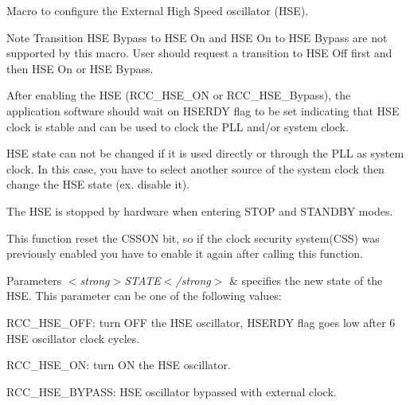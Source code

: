 Macro to configure the External High Speed oscillator (H\+SE). 

\begin{DoxyNote}{Note}
Transition H\+SE Bypass to H\+SE On and H\+SE On to H\+SE Bypass are not supported by this macro. User should request a transition to H\+SE Off first and then H\+SE On or H\+SE Bypass. 

After enabling the H\+SE (R\+C\+C\+\_\+\+H\+S\+E\+\_\+\+ON or R\+C\+C\+\_\+\+H\+S\+E\+\_\+\+Bypass), the application software should wait on H\+S\+E\+R\+DY flag to be set indicating that H\+SE clock is stable and can be used to clock the P\+LL and/or system clock. 

H\+SE state can not be changed if it is used directly or through the P\+LL as system clock. In this case, you have to select another source of the system clock then change the H\+SE state (ex. disable it). 

The H\+SE is stopped by hardware when entering S\+T\+OP and S\+T\+A\+N\+D\+BY modes. 

This function reset the C\+S\+S\+ON bit, so if the clock security system(\+C\+S\+S) was previously enabled you have to enable it again after calling this function. 
\end{DoxyNote}

\begin{DoxyParams}{Parameters}
{\em $<$strong$>$\+S\+T\+A\+T\+E$<$/strong$>$} & specifies the new state of the H\+SE. This parameter can be one of the following values\+: \begin{DoxyItemize}
\item R\+C\+C\+\_\+\+H\+S\+E\+\_\+\+O\+FF\+: turn O\+FF the H\+SE oscillator, H\+S\+E\+R\+DY flag goes low after 6 H\+SE oscillator clock cycles. \item R\+C\+C\+\_\+\+H\+S\+E\+\_\+\+ON\+: turn ON the H\+SE oscillator. \item R\+C\+C\+\_\+\+H\+S\+E\+\_\+\+B\+Y\+P\+A\+SS\+: H\+SE oscillator bypassed with external clock. \end{DoxyItemize}
\\
\hline
\end{DoxyParams}
